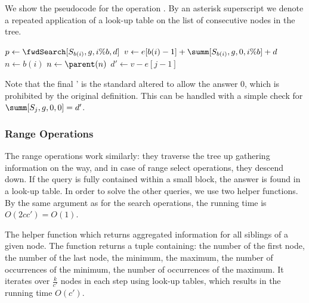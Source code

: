 We show the pseudocode for the operation \fwdSearch{}.
By an asterisk superscript we denote a repeated application of a look-up table on the list of consecutive nodes in the tree.

\begin{algorithm}
\begin{algorithmic}
	\State $p \gets \fwdSearch[S_{b(i)}, g, i \% b, d]$
		\State {}
	\Else
		\State $v \gets e[b(i) - 1] + \summ[S_{b(i)}, g, 0, i \% b] + d$
		\State $n \gets b(i)$ 
		 
			\State $n \gets \parent(n)$
				\State {}
			\EndIf
		\EndWhile
			 
		\EndWhile
		\State $d' \gets v - e[j - 1]$ 
		\State {} 
	\EndIf
\EndFunction
\end{algorithmic}
\end{algorithm}

Note that the final \fwdSearch' is the standard \fwdSearch{} altered to allow the answer $0$, which is prohibited by the original definition.
This can be handled with a simple check for $\summ[S_j, g, 0, 0] = d'$.

\subsubsection{Range Operations}

The range operations work similarly: they traverse the tree up gathering information on the way, and in case of range select operations, they descend down.
If the query is fully contained within a small block, the answer is found in a look-up table.
In order to solve the other queries, we use two helper functions.
By the same argument as for the search operations, the running time is $O(2 c c') = O(1)$.

The helper function \rmqInfo{} which returns aggregated information for all siblings of a given node.
The function returns a tuple containing: the number of the first node, the number of the last node, the minimum, the maximum, the number of occurrences of the minimum, the number of occurrences of the maximum.
It iterates over $\frac{k}{c'}$ nodes in each step using look-up tables, which results in the running time $O(c')$.

